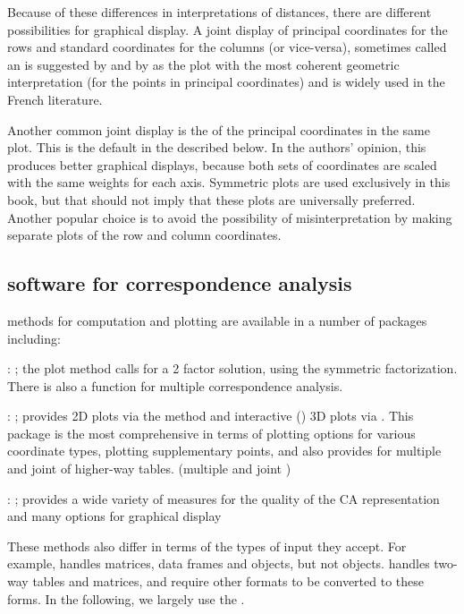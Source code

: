 \documentclass[11pt]{book}\usepackage[]{graphicx}\usepackage[]{color}
\begin{document}
Because of these differences in interpretations of distances, there
are different possibilities for graphical display.
A joint display of principal coordinates for the rows and standard
coordinates for the columns (or vice-versa), sometimes called
an  is suggested by
\citet{GreenacreHastie:87} and by \citet{Greenacre:89} as the plot
with the most coherent geometric interpretation
(for the points in principal coordinates) and is widely
used in the French literature.

Another common joint display is the  of the principal
coordinates in the same plot.  This is the default
in the  described below.
In the authors' opinion, this produces better graphical displays, because
both sets of coordinates are scaled with the same weights for each axis.
Symmetric plots are used exclusively in this book, but that should
not imply that these plots are universally preferred.
Another popular choice is to avoid the possibility of misinterpretation
by making separate plots of the row and column coordinates.

\subsection{\R software for correspondence analysis}\label{sec:ca-R}

\CA methods for computation and plotting are available in a number of
\R packages including:
\begin{description*}
  \item {}: ; the plot method calls  for a 2 factor solution, using the symmetric factorization.  There is also a  function for
  multiple correspondence analysis.
  \item {}: ; provides 2D plots via the  method and
  interactive () 3D plots via .  This package is the most
  comprehensive in terms of plotting options for various coordinate types,
  plotting supplementary points,
  and also provides  for multiple and joint \ca of higher-way tables.
   (multiple and joint \ca)
  \item {}: ; provides a wide variety of measures for the 
  quality of the CA representation and many options for graphical display
\end{description*}
These methods also differ in terms of the types of input they accept.  For
example,  handles matrices, data frames and
 objects, but not  objects. 
 handles two-way tables and matrices, and require other
formats to be converted to these forms.
In the following,
we largely use the .
\end{document}
